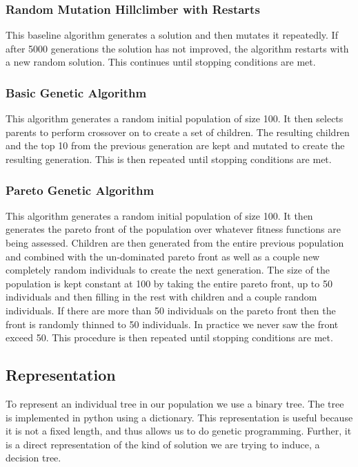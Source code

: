 \documentclass{acm_proc_article-sp}
\begin{document}
\subsubsection{Random Mutation Hillclimber with Restarts}

This baseline algorithm generates a solution and then mutates it repeatedly. If after 5000 generations the solution has not improved, the algorithm restarts with a new random solution. This continues until stopping conditions are met.

\subsubsection{Basic Genetic Algorithm}

This algorithm generates a random initial population of size 100. It then selects parents to perform crossover on to create a set of children. The resulting children and the top 10 from the previous generation are kept and mutated to create the resulting generation. This is then repeated until stopping conditions are met.

\subsubsection{Pareto Genetic Algorithm}

This algorithm generates a random initial population of size 100. It then generates the pareto front of the population over whatever fitness functions are being assessed. Children are then generated from the entire previous population and combined with the un-dominated pareto front as well as a couple new completely random individuals to create the next generation. The size of the population is kept constant at 100 by taking the entire pareto front, up to 50 individuals and then filling in the rest with children and a couple random individuals. If there are more than 50 individuals on the pareto front then the front is randomly thinned to 50 individuals. In practice we never saw the front exceed 50. This procedure is then repeated until stopping conditions are met.

\subsection{Representation}

To represent an individual tree in our population we use a binary tree. The tree is implemented in python using a dictionary. This representation is useful because it is not a fixed length, and thus allows us to do genetic programming. Further, it is a direct representation of the kind of solution we are trying to induce, a decision tree.
\end{document}
